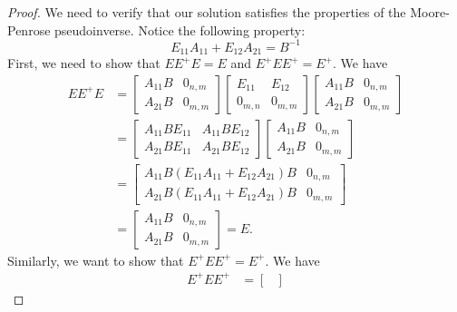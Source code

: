 \documentclass[10pt,a4paper]{amsart}
\begin{document}
  \begin{proof}
    We need to verify that our solution satisfies the properties of the Moore-Penrose pseudoinverse. Notice the following property: 
    \begin{equation}
      E_{11}A_{11}+E_{12}A_{21} = B^{-1}
    \end{equation}
    First, we need to show that $E E^{+} E = E$ and $E^{+} E E^{+} = E^{+}$. We have
    \begin{align}
      EE^{+}E &= 
      \begin{bmatrix} 
        A_{11} B & 0_{n,m} \\ 
        A_{21} B & 0_{m,m} 
      \end{bmatrix} 
      \begin{bmatrix} 
        E_{11} & E_{12} \\ 
        0_{m,n} & 0_{m,m} 
      \end{bmatrix} 
      \begin{bmatrix} 
        A_{11} B & 0_{n,m} \\ 
        A_{21} B & 0_{m,m} 
      \end{bmatrix}  \nonumber \\
      &= 
      \begin{bmatrix} 
        A_{11} B E_{11} & A_{11} B E_{12} \\
        A_{21} B E_{11} & A_{21}BE_{12} 
      \end{bmatrix} 
      \begin{bmatrix} 
        A_{11} B & 0_{n,m} \\
        A_{21} B & 0_{m,m} 
      \end{bmatrix} \nonumber \\
      &= 
      \begin{bmatrix} 
        A_{11} B (E_{11} A_{11} + E_{12} A_{21}) B & 0_{n,m} \\ 
        A_{21} B (E_{11} A_{11} + E_{12} A_{21}) B & 0_{m,m} 
      \end{bmatrix} \nonumber \\
      &= 
      \begin{bmatrix} A_{11} B & 0_{n,m} \\ 
        A_{21} B & 0_{m,m} 
      \end{bmatrix} = E.
    \end{align}
    Similarly, we want to show that $E^{+} E E^{+} = E^{+}$. We have
    \begin{align}
      E^{+} E E^{+} &= 
      \begin{bmatrix} 

\end{bmatrix}
\end{align}
\end{proof}
\end{document}

